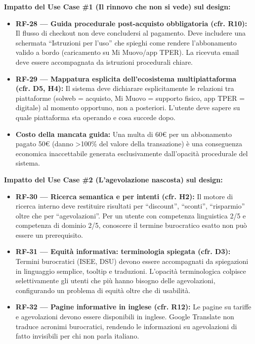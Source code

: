 ﻿\documentclass[11pt,a4paper]{article}
\begin{document}
\vspace{0.3cm}

\begin{tcolorbox}[base]
    {\small
    \textbf{Impatto del Use Case \#1 (Il rinnovo che non si vede) sul design:} \\[4pt]
    \begin{itemize}[leftmargin=*]
        \item \textbf{RF-28 --- Guida procedurale post-acquisto obbligatoria (cfr. R10):} Il flusso di checkout non deve concludersi al pagamento. Deve includere una schermata ``Istruzioni per l'uso'' che spieghi come rendere l'abbonamento valido a bordo (caricamento su Mi Muovo/app TPER). La ricevuta email deve essere accompagnata da istruzioni procedurali chiare.

        \item \textbf{RF-29 --- Mappatura esplicita dell'ecosistema multipiattaforma (cfr. D5, H4):} Il sistema deve dichiarare esplicitamente le relazioni tra piattaforme (solweb = acquisto, Mi Muovo = supporto fisico, app TPER = digitale) al momento opportuno, non a posteriori. L'utente deve sapere su quale piattaforma sta operando e cosa succede dopo.

        \item \textbf{Costo della mancata guida:} Una multa di 60\euro{} per un abbonamento pagato 50\euro{} (danno >100\% del valore della transazione) è una conseguenza economica inaccettabile generata esclusivamente dall'opacit\`a procedurale del sistema.
    \end{itemize}
    \vspace{0.2cm}
    \textbf{Impatto del Use Case \#2 (L'agevolazione nascosta) sul design:} \\[4pt]
    \begin{itemize}[leftmargin=*]
        \item \textbf{RF-30 --- Ricerca semantica e per intenti (cfr. H2):} Il motore di ricerca interno deve restituire risultati per ``discount'', ``sconti'', ``risparmio'' oltre che per ``agevolazioni''. Per un utente con competenza linguistica 2/5 e competenza di dominio 2/5, conoscere il termine burocratico esatto non può essere un prerequisito.

        \item \textbf{RF-31 --- Equità informativa: terminologia spiegata (cfr. D3):} Termini burocratici (ISEE, DSU) devono essere accompagnati da spiegazioni in linguaggio semplice, tooltip e traduzioni. L'opacit\`a terminologica colpisce selettivamente gli utenti che più hanno bisogno delle agevolazioni, configurando un problema di equità oltre che di usabilità.

        \item \textbf{RF-32 --- Pagine informative in inglese (cfr. R12):} Le pagine su tariffe e agevolazioni devono essere disponibili in inglese. Google Translate non traduce acronimi burocratici, rendendo le informazioni su agevolazioni di fatto invisibili per chi non parla italiano.
    \end{itemize}
    }
\end{tcolorbox}
\end{document}
